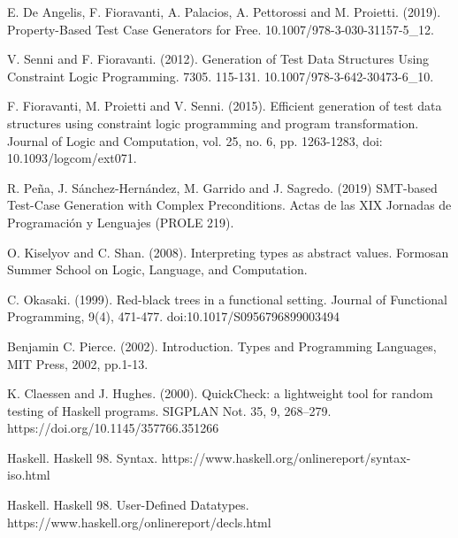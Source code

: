 \documentclass{report}
\theoremstyle{definition}
\theoremstyle{definition}
\begin{document}
			
	\begin{thebibliography}{9}
		E. De Angelis, F. Fioravanti, A. Palacios, A. Pettorossi and M. Proietti. (2019). Property-Based Test Case Generators for Free. 10.1007/978-3-030-31157-5\_12. 
												
		V. Senni and F. Fioravanti. (2012). Generation of Test Data Structures Using Constraint Logic Programming. 7305. 115-131. 10.1007/978-3-642-30473-6\_10.
												
		F. Fioravanti, M. Proietti and V. Senni. (2015). Efficient generation of test data structures using constraint logic programming and program transformation. Journal of Logic and Computation, vol. 25, no. 6, pp. 1263-1283, doi: 10.1093/logcom/ext071.
												
		R. Peña, J. Sánchez-Hernández, M. Garrido and J. Sagredo. (2019) SMT-based Test-Case Generation with Complex Preconditions. Actas de las XIX Jornadas de Programación y Lenguajes (PROLE 219).
												
		O. Kiselyov and C. Shan. (2008). Interpreting types as abstract values. Formosan Summer School on Logic, Language, and Computation.
												
		C. Okasaki. (1999). Red-black trees in a functional setting. Journal of Functional Programming, 9(4), 471-477. doi:10.1017/S0956796899003494
												
		Benjamin C. Pierce. (2002). Introduction. Types and Programming Languages, MIT Press, 2002, pp.1-13.
												
		K. Claessen and J. Hughes. (2000). QuickCheck: a lightweight tool for random testing of Haskell programs. SIGPLAN Not. 35, 9, 268–279. https://doi.org/10.1145/357766.351266
												
		Haskell. Haskell 98. Syntax. https://www.haskell.org/onlinereport/syntax-iso.html
												
		Haskell. Haskell 98. User-Defined Datatypes. https://www.haskell.org/onlinereport/decls.html
												
												
	\end{thebibliography}
			
\end{document}
